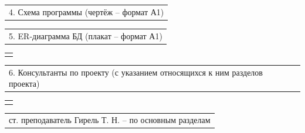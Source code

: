 \documentclass[12pt, А4, twoside]{article}
\begin{document}
\begin{FlushLeft}
    \vspace{-0.1 cm}

    \begin{tabular}{p{17.25cm}}
        \hspace{0.3cm} \textsf{4. Схема программы (чертёж -- формат А1)} \vspace{0pt} \hline  \\
    \end{tabular}

    \vspace{-0.1 cm}
    
    \begin{tabular}{p{17.25cm}}
        \hspace{0.3cm} \textsf{5. ER-диаграмма БД (плакат -- формат А1)} \vspace{0pt} \hline  \\
    \end{tabular}

    \begin{tabular}{p{17.25cm}}
        \vspace{0pt} \hline  \\
    \end{tabular}
    


    \vspace{-0.1 cm}

    \begin{tabular}{p{17.25cm}}
        \textsf{6. Консультанты по проекту (с указанием относящихся к ним разделов проекта)} \vspace{0pt} \hline \\
    \end{tabular}

    \begin{tabular}{p{17.25cm}}
        \vspace{0pt} \hline \\
    \end{tabular}

    \vspace{-0.1 cm}

    \begin{tabular}{p{17.25cm}}
        \hspace{0.3cm} \textsf{ст. преподаватель Гирель Т. Н.} \hspace{4.065cm} \textsf{{--} по основным разделам} \vspace{0pt} \hline \\
    \end{tabular}


\end{FlushLeft}
\end{document}

